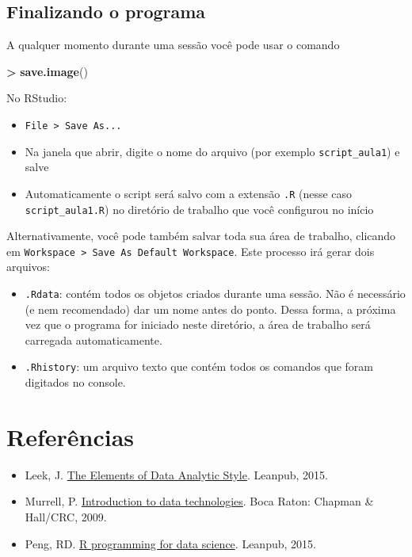 \documentclass[10pt,a4paper]{book}
\newenvironment{Shaded}{\begin{snugshade}}{\end{snugshade}}
\newcommand{\KeywordTok}[1]{\textcolor[rgb]{0.13,0.29,0.53}{\textbf{#1}}}
\newcommand{\StringTok}[1]{\textcolor[rgb]{0.31,0.60,0.02}{#1}}
\newcommand{\OperatorTok}[1]{\textcolor[rgb]{0.81,0.36,0.00}{\textbf{#1}}}
\newcommand{\NormalTok}[1]{#1}
\providecommand{\tightlist}{%
  \setlength{\itemsep}{0pt}\setlength{\parskip}{0pt}}
\begin{document}
\subsection{Finalizando o programa}\label{finalizando-o-programa}

A qualquer momento durante uma sessão você pode usar o comando

\begin{Shaded}
\begin{Highlighting}[]
\OperatorTok{>}\StringTok{ }\KeywordTok{save.image}\NormalTok{()}
\end{Highlighting}
\end{Shaded}

No RStudio:

\begin{itemize}
\tightlist
\item
  \texttt{File\ \textgreater{}\ Save\ As...}
\item
  Na janela que abrir, digite o nome do arquivo (por exemplo
  \texttt{script\_aula1}) e salve
\item
  Automaticamente o script será salvo com a extensão \texttt{.R} (nesse
  caso \texttt{script\_aula1.R}) no diretório de trabalho que você
  configurou no início
\end{itemize}

Alternativamente, você pode também salvar toda sua área de trabalho,
clicando em
\texttt{Workspace\ \textgreater{}\ Save\ As\ Default\ Workspace}. Este
processo irá gerar dois arquivos:

\begin{itemize}
\tightlist
\item
  \texttt{.Rdata}: contém todos os objetos criados durante uma sessão.
  Não é necessário (e nem recomendado) dar um nome antes do ponto. Dessa
  forma, a próxima vez que o programa for iniciado neste diretório, a
  área de trabalho será carregada automaticamente.
\item
  \texttt{.Rhistory}: um arquivo texto que contém todos os comandos que
  foram digitados no console.
\end{itemize}

\section*{Referências}\label{referencias}


\begin{itemize}
\tightlist
\item
  Leek, J. \href{https://leanpub.com/datastyle}{The Elements of Data
  Analytic Style}. Leanpub, 2015.
\item
  Murrell, P.
  \href{https://www.stat.auckland.ac.nz/~paul/ItDT/HTML}{Introduction to
  data technologies}. Boca Raton: Chapman \& Hall/CRC, 2009.
\item
  Peng, RD. \href{https://leanpub.com/rprogramming}{R programming for
  data science}. Leanpub, 2015.
\end{itemize}
\end{document}
